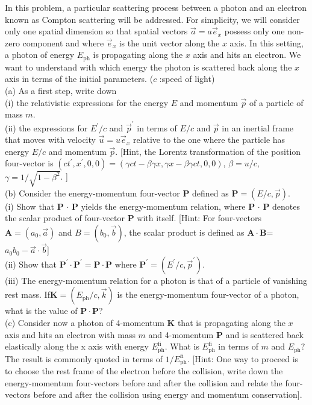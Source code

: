 \begin{example}
    In this problem, a particular scattering process between a photon and an electron known as Compton scattering will be addressed. For simplicity, we will consider only one spatial dimension so that spatial vectors $\vec{a}=a\vec{e}_x$ possess only one non-zero component and where $\vec{e}_x$ is the unit vector along the $x$ axis. In this setting, a photon of energy $E_\mathrm{ph}$ is propagating along the $x$ axis and hits an electron. We want to understand with which energy the photon is scattered back along the $x$ axis in terms of the initial parameters. ($c$ :speed of light)
\\(a) As a first step, write down
\\(i) the relativistic expressions for the energy $E$ and momentum $\vec{p}$ of a particle of mass $m.$
\\(ii) the expressions for $E^\prime/c$ and $\vec{p}^{\prime}$ in terms of $E/c$ and $\vec{p}$ in an inertial frame that moves with
velocity $\vec{u}=u\vec{e}_{x}$ relative to the one where the particle has energy $E/c$ and momentum $\vec{p}.$
[Hint, the Lorentz transformation of the position four-vector is $(ct^{\prime},x^{\prime},0,0)=(\gamma ct-\beta\gamma x,\gamma x-\beta \gamma ct, 0, 0)$, $\beta = u/ c$, $\gamma = 1/ \sqrt {1- \beta ^2}$. ]
\\(b) Consider the energy-momentum four-vector $\mathbf{P}$ defined as $\mathbf{P}=(E/c,\vec{p})$.\\
(i) Show that $\mathbf{P}$ $\cdot$ $\mathbf{P}$ yields the energy-momentum relation, where $\mathbf{P}$ $\cdot$ $\mathbf{P}$ denotes the scalar product of four-vector $\mathbf{P}$ with itself. [Hint: For four-vectors $\mathbf{A}=(a_0,\vec{a})$ and $B=(b_0,\vec{b})$, the scalar product is defined as  $\mathbf{A}\cdot\mathbf{B}$=$a_{0}b_{0}-\vec{a}\cdot\vec{b}$]\\
(ii) Show that $\mathbf{P}^\prime\cdot\mathbf{P}^{\prime}=\mathbf{P}\cdot\mathbf{P}$ where $\mathbf{P}^\prime=(E^{\prime}/c,\vec{p}^{\prime})$.\\
(iii) The energy-momentum relation for a photon is that of a particle of vanishing rest mass. If$\mathbf{K} = ( E_{\mathrm{ph}}/ c, \vec{k} )$ is the energy-momentum four-vector of a photon, what is the value of $\mathbf{P}\cdot\mathbf{P}$?\\
(c) Consider now a photon of 4-momentum $\textbf{K}$ that is propagating along the $x$ axis and hits an electron with mass $m$ and 4-momentum $\textbf{P}$ and is scattered back elastically along the x axis with energy $E_{\mathrm{ph}}^{\mathrm{fi}}.$ What is $E_\mathrm{ph}^\mathrm{fi}$ in terms of $m$ and $E_\mathrm{ph}?$ The result is commonly quoted in terms of $1/E_\mathrm{ph}^\mathrm{fi}$.
[Hint: One way to proceed is to choose the rest frame of the electron before the collision, write down the energy-momentum four-vectors before and after the collision and relate the four-vectors before and after the collision using energy and momentum conservation].
\end{example}